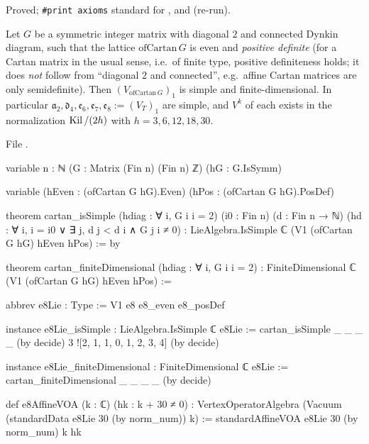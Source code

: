 \begin{status}
Proved; \texttt{\#print axioms} standard for ,  and  (re-run).
\end{status}

\begin{theorem}\label{l23:thm:cartansimple}
Let $G$ be a symmetric integer matrix with diagonal $2$ and connected Dynkin diagram, such that the lattice $\mathrm{ofCartan}\,G$ is
even and \emph{positive definite} (for a Cartan matrix in the usual sense, i.e.\ of finite type, positive definiteness holds; it does
\emph{not} follow from ``diagonal $2$ and connected'', e.g.\ affine Cartan matrices are only semidefinite). Then
$(V_{\mathrm{ofCartan}\,G})_1$ is simple and finite-dimensional. In particular $\mathfrak{a}_2,\mathfrak{d}_4,\mathfrak e_6,\mathfrak e_7,\mathfrak e_8:=(V_T)_1$ are simple, and $V^k$
of each exists in the normalization $\operatorname{Kil}/(2h)$ with $h=3,6,12,18,30$.
\end{theorem}
\noindent File .
\begin{leancode}
variable {n : ℕ} (G : Matrix (Fin n) (Fin n) ℤ) (hG : G.IsSymm)

variable (hEven : (ofCartan G hG).Even) (hPos : (ofCartan G hG).PosDef)

theorem cartan_isSimple (hdiag : ∀ i, G i i = 2) (i0 : Fin n) (d : Fin n → ℕ)
    (hd : ∀ i, i = i0 ∨ ∃ j, d j < d i ∧ G j i ≠ 0) :
    LieAlgebra.IsSimple ℂ (V1 (ofCartan G hG) hEven hPos) := by

theorem cartan_finiteDimensional (hdiag : ∀ i, G i i = 2) :
    FiniteDimensional ℂ (V1 (ofCartan G hG) hEven hPos) :=

abbrev e8Lie : Type := V1 e8 e8_even e8_posDef

instance e8Lie_isSimple : LieAlgebra.IsSimple ℂ e8Lie :=
  cartan_isSimple _ _ _ _ (by decide) 3 ![2, 1, 1, 0, 1, 2, 3, 4] (by decide)

instance e8Lie_finiteDimensional : FiniteDimensional ℂ e8Lie :=
  cartan_finiteDimensional _ _ _ _ (by decide)

def e8AffineVOA (k : ℂ) (hk : k + 30 ≠ 0) :
    VertexOperatorAlgebra (Vacuum (standardData e8Lie 30 (by norm_num)) k) :=
  standardAffineVOA e8Lie 30 (by norm_num) k hk
\end{leancode}

